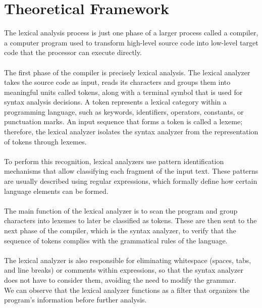 \documentclass[letterpaper,12pt,oneside]{article}
\begin{document}

\section{Theoretical Framework}
The lexical analysis process is just one phase of a larger process called a compiler, a computer program used to transform high-level source code into low-level target code that the processor can execute directly.
\\ \\
The first phase of the compiler is precisely lexical analysis. The lexical analyzer takes the source code as input, reads its characters and groups them into meaningful units called tokens, along with a terminal symbol that is used for syntax analysis decisions. A token represents a lexical category within a programming language, such as keywords, identifiers, operators, constants, or punctuation marks. An input sequence that forms a token is called a lexeme; therefore, the lexical analyzer isolates the syntax analyzer from the representation of tokens through lexemes.
\\ \\
To perform this recognition, lexical analyzers use pattern identification mechanisms that allow classifying each fragment of the input text. These patterns are usually described using regular expressions, which formally define how certain language elements can be formed.
\\ \\
The main function of the lexical analyzer is to scan the program and group characters into lexemes to later be classified as tokens. These are then sent to the next phase of the compiler, which is the syntax analyzer, to verify that the sequence of tokens complies with the grammatical rules of the language.
\\ \\
The lexical analyzer is also responsible for eliminating whitespace (spaces, tabs, and line breaks) or comments within expressions, so that the syntax analyzer does not have to consider them, avoiding the need to modify the grammar.
\\
We can observe that the lexical analyzer functions as a filter that organizes the program's information before further analysis.~\cite{aho2006compilers}
\\
\end{document}
